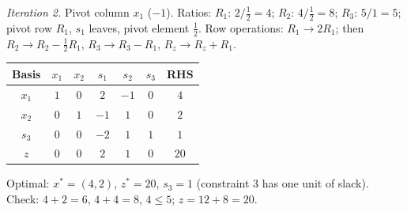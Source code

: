 \begin{solutions}
        \emph{Iteration 2.} Pivot column $x_1$ ($-1$). Ratios:
        $R_1$: $2\big/\tfrac12=4$; $R_2$: $4\big/\tfrac12=8$; $R_3$:
        $5/1=5$; pivot row $R_1$, $s_1$ leaves, pivot element $\tfrac12$.
        Row operations: $R_1\to 2R_1$; then $R_2\to R_2-\tfrac12R_1$,
        $R_3\to R_3-R_1$, $R_z\to R_z+R_1$.
        \begin{center}
        \begin{tabular}{c|ccccc|c}
        Basis & $x_1$ & $x_2$ & $s_1$ & $s_2$ & $s_3$ & RHS\\
        \hline
        $x_1$ & $1$ & $0$ & $2$ & $-1$ & $0$ & $4$\\
        $x_2$ & $0$ & $1$ & $-1$ & $1$ & $0$ & $2$\\
        $s_3$ & $0$ & $0$ & $-2$ & $1$ & $1$ & $1$\\
        \hline
        $z$ & $0$ & $0$ & $2$ & $1$ & $0$ & $20$\\
        \end{tabular}
        \end{center}
        Optimal: $x^{*}=(4,2)$, $z^{*}=20$, $s_3=1$ (constraint 3 has one
        unit of slack). Check: $4+2=6$, $4+4=8$, $4\le 5$;
        $z=12+8=20$.


\end{solutions}
